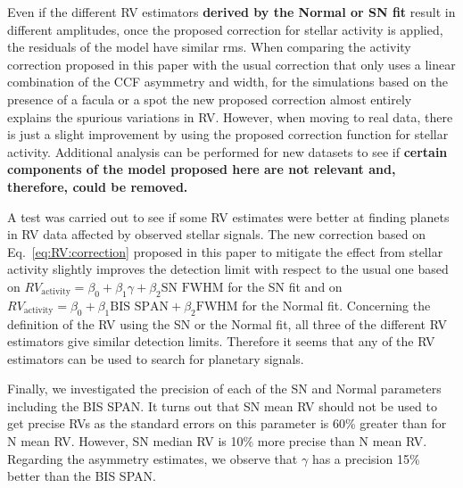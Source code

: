 \documentclass{aa}
\begin{document}
Even if the different RV estimators {\bf derived by the Normal or SN fit} result in different amplitudes, once the proposed correction for stellar activity is applied, the residuals of the model have similar rms.
When comparing the activity correction proposed in this paper with the usual correction that only uses a linear combination of the CCF asymmetry and width, for the simulations based on the presence of a facula or a spot the new proposed correction almost entirely explains the spurious variations in RV. However, when moving to real data, there is just a slight improvement by using the proposed correction function for stellar activity. 
Additional analysis can be performed for new datasets to see if {\bf certain components of the model proposed here are not relevant and, therefore, could be removed.}

A test was carried out to see if some RV estimates were better at finding planets in RV data affected by observed stellar signals. The new correction based on Eq.~\eqref{eq:RV:correction} proposed in this paper to mitigate the effect from stellar activity slightly improves the detection limit with respect to the usual one based on $RV_{\text{activity}}=\beta_0+\beta_1 \gamma + \beta_2 \text{SN FWHM}$ for the SN fit and on $RV_{\text{activity}}=\beta_0+\beta_1 \text{BIS SPAN} + \beta_2 \text{FWHM}$ for the Normal fit.
Concerning the definition of the RV using the SN or the Normal fit, all three of the different RV estimators give similar detection limits. Therefore it seems that any of the RV estimators can be used to search for planetary signals.

Finally, we investigated the precision of each of the SN and Normal parameters including the BIS SPAN. It turns out that SN mean RV should not be used to get precise RVs as the standard errors on this parameter is 60\% greater than for N mean RV. 
However, SN median RV is 10\% more precise than N mean RV. 
Regarding the asymmetry estimates, we observe that $\gamma$ has a precision 15\% better than the BIS SPAN.

\end{document}
